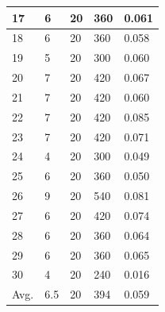\documentclass[runningheads]{llncs}
\begin{document}
\begin{table}[]
\begin{tabular}{|l|l|l|l|l|}
        17 & 6 & 20 & 360 & 0.061 \\ \hline
        18 & 6 & 20 & 360 & 0.058 \\ \hline
        19 & 5 & 20 & 300 & 0.060 \\ \hline
        20 & 7 & 20 & 420 & 0.067 \\ \hline
        21 & 7 & 20 & 420 & 0.060 \\ \hline
        22 & 7 & 20 & 420 & 0.085 \\ \hline
        23 & 7 & 20 & 420 & 0.071 \\ \hline
        24 & 4 & 20 & 300 & 0.049 \\ \hline
        25 & 6 & 20 & 360 & 0.050 \\ \hline
        26 & 9 & 20 & 540 & 0.081 \\ \hline
        27 & 6 & 20 & 420 & 0.074 \\ \hline
        28 & 6 & 20 & 360 & 0.064 \\ \hline
        29 & 6 & 20 & 360 & 0.065 \\ \hline
        30 & 4 & 20 & 240 & 0.016 \\ \hline
        Avg. & 6.5 & 20 & 394 & 0.059 \\ \hline
        \end{tabular}
        \end{table}
\end{document}
